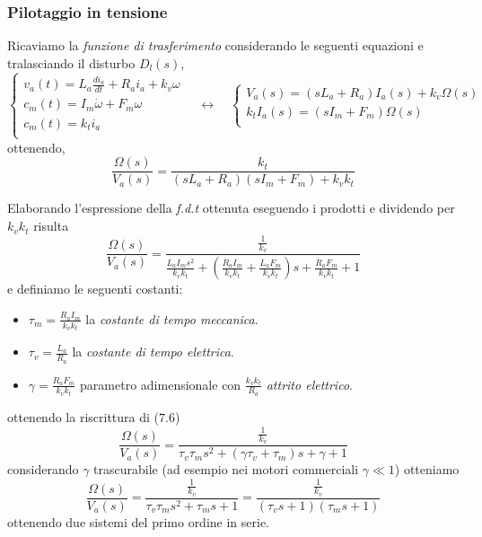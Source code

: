 \subsubsection{Pilotaggio in tensione}
Ricaviamo la \emph{funzione di trasferimento} considerando le seguenti equazioni e tralasciando il disturbo $D_l(s)$,
\begin{equation}
	\begin{cases}
		v_a(t) = L_a \frac{d i_a}{dt} + R_a i_a + k_v \omega \\
		c_m(t) = I_m \dot{\omega} + F_m \omega \\
		c_m(t) = k_t i_a \\
	\end{cases}
	\quad\longleftrightarrow\quad 
	\begin{cases}
		V_a(s) = (sL_a + R_a)I_a(s) + k_v \Omega(s) \\
		k_t I_a(s) = (sI_m + F_m) \Omega(s) \\
	\end{cases}
\end{equation}
ottenendo,
\begin{equation}
	\frac{\Omega(s)}{V_a(s)} = \frac{k_t}{(sL_a + R_a)(sI_m + F_m) + k_v k_t}
\end{equation}

Elaborando l'espressione della \emph{f.d.t} ottenuta eseguendo i prodotti e dividendo per $k_vk_t$ risulta
\begin{equation}
	\frac{\Omega(s)}{V_a(s)} = \frac{\frac{1}{k_v}}{\frac{L_a I_m s^2}{k_v k_t} + (\frac{R_a I_m}{k_v k_t} + \frac{L_a F_m}{k_v k_t})s + \frac{R_aF_m}{k_v k_t} + 1}
\end{equation}
e definiamo le seguenti costanti:
\begin{itemize}
	\item $\tau_m = \frac{R_a I_m}{k_v k_t}$ la \emph{costante di tempo meccanica}.
	\item $\tau_v = \frac{L_a}{R_a}$ la \emph{costante di tempo elettrica}.
	\item $\gamma = \frac{R_a F_m}{k_v k_t}$ parametro adimensionale con $\frac{k_vk_t}{R_a}$ \emph{attrito elettrico}.
\end{itemize}
ottenendo la riscrittura di ($7.6$)
\begin{equation}
	\frac{\Omega(s)}{V_a(s)} = \frac{\frac{1}{k_v}}{\tau_v \tau_m s^2 +  (\gamma \tau_v + \tau_m)s + \gamma +1}
\end{equation}
considerando $\gamma$ trascurabile (ad esempio nei motori commerciali $\gamma \ll 1$) otteniamo
\begin{equation}
	\frac{\Omega(s)}{V_a(s)} = \frac{\frac{1}{k_v}}{\tau_v \tau_m s^2 + \tau_m s + 1} = \frac{\frac{1}{k_v}}{(\tau_v s + 1)(\tau_m s + 1)}
\end{equation}
ottenendo due sistemi del primo ordine in serie.

